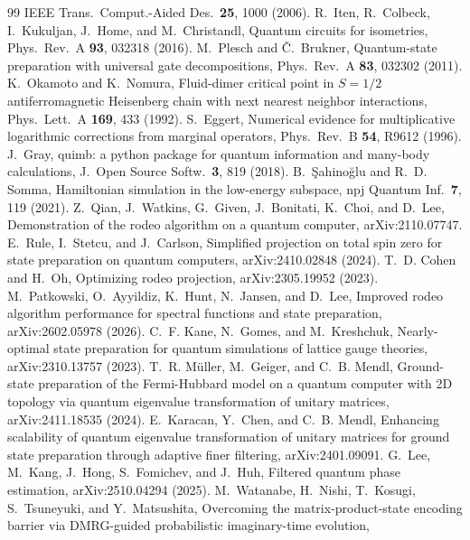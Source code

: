 \documentclass[aps,pra,twocolumn,superscriptaddress,nofootinbib]{revtex4-2}
\begin{document}
\begin{thebibliography}{99}
  IEEE Trans.\ Comput.-Aided Des.\ \textbf{25}, 1000 (2006).
 R.~Iten, R.~Colbeck, I.~Kukuljan, J.~Home, and M.~Christandl, Quantum circuits for isometries,
  Phys.\ Rev.\ A \textbf{93}, 032318 (2016).
 M.~Plesch and \v{C}.~Brukner, Quantum-state preparation with universal gate decompositions,
  Phys.\ Rev.\ A \textbf{83}, 032302 (2011).
 K.~Okamoto and K.~Nomura, Fluid-dimer critical point in $S=1/2$ antiferromagnetic
  Heisenberg chain with next nearest neighbor interactions, Phys.\ Lett.\ A \textbf{169}, 433 (1992).
 S.~Eggert, Numerical evidence for multiplicative logarithmic corrections from
  marginal operators, Phys.\ Rev.\ B \textbf{54}, R9612 (1996).
 J.~Gray, quimb: a python package for quantum information and many-body calculations,
  J.\ Open Source Softw.\ \textbf{3}, 819 (2018).
 B.~\c{S}ahino\u{g}lu and R.~D. Somma, Hamiltonian simulation in the low-energy
  subspace, npj Quantum Inf.\ \textbf{7}, 119 (2021).
 Z.~Qian, J.~Watkins, G.~Given, J.~Bonitati, K.~Choi, and D.~Lee, Demonstration of the rodeo
  algorithm on a quantum computer, arXiv:2110.07747.
 E.~Rule, I.~Stetcu, and J.~Carlson, Simplified projection on total spin zero for state
  preparation on quantum computers, arXiv:2410.02848 (2024).
 T.~D. Cohen and H.~Oh, Optimizing rodeo projection, arXiv:2305.19952 (2023).
 M.~Patkowski, O.~Ayyildiz, K.~Hunt, N.~Jansen, and D.~Lee, Improved rodeo algorithm
  performance for spectral functions and state preparation, arXiv:2602.05978 (2026).
 C.~F. Kane, N.~Gomes, and M.~Kreshchuk, Nearly-optimal state preparation for quantum
  simulations of lattice gauge theories, arXiv:2310.13757 (2023).
 T.~R. M\"uller, M.~Geiger, and C.~B. Mendl, Ground-state preparation of the Fermi-Hubbard
  model on a quantum computer with 2D topology via quantum eigenvalue transformation of unitary matrices,
  arXiv:2411.18535 (2024).
 E.~Karacan, Y.~Chen, and C.~B. Mendl, Enhancing scalability of quantum eigenvalue
  transformation of unitary matrices for ground state preparation through adaptive finer filtering,
  arXiv:2401.09091.
 G.~Lee, M.~Kang, J.~Hong, S.~Fomichev, and J.~Huh, Filtered quantum phase estimation,
  arXiv:2510.04294 (2025).
 M.~Watanabe, H.~Nishi, T.~Kosugi, S.~Tsuneyuki, and Y.~Matsushita, Overcoming the
  matrix-product-state encoding barrier via DMRG-guided probabilistic imaginary-time evolution,

\end{thebibliography}
\end{document}
